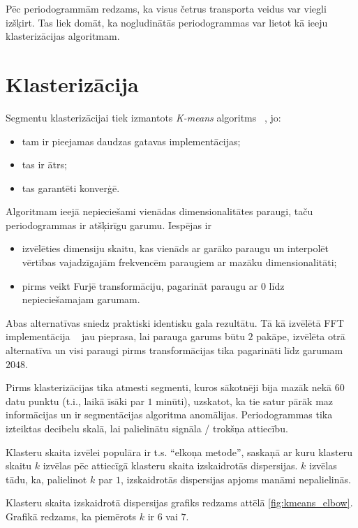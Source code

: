 \documentclass{ludis}
\begin{document}
Pēc periodogrammām redzams, ka visus četrus transporta veidus var viegli izšķirt. Tas liek domāt,
ka nogludinātās periodogrammas var lietot kā ieeju klasterizācijas algoritmam.

\section{Klasterizācija}
Segmentu klasterizācijai tiek izmantots \emph{K-means} algoritms ~\cite{Rcore}, jo:
\begin{itemize}
\item tam ir pieejamas daudzas gatavas implementācijas;
\item tas ir ātrs;
\item tas garantēti konverģē.
\end{itemize}

Algoritmam ieejā nepieciešami vienādas dimensionalitātes paraugi, taču periodogrammas ir atšķirīgu
garumu. Iespējas ir 
\begin{itemize}
\item izvēlēties dimensiju skaitu, kas vienāds ar garāko paraugu un interpolēt vērtības 
  vajadzīgajām frekvencēm paraugiem ar mazāku dimensionalitāti;
\item pirms veikt Furjē transformāciju, pagarināt paraugu ar $0$ līdz nepieciešamajam garumam.
\end{itemize}

Abas alternatīvas sniedz praktiski identisku gala rezultātu. Tā kā izvēlētā FFT
implementācija ~\cite{commons_math} jau pieprasa, lai parauga garums būtu $2$ pakāpe, 
izvēlēta otrā alternatīva un visi paraugi pirms transformācijas tika pagarināti līdz garumam $2048$.

Pirms klasterizācijas tika atmesti segmenti, kuros sākotnēji bija mazāk nekā $60$ datu punktu (t.i.,
laikā īsāki par $1$ minūti), uzskatot, ka tie satur pārāk maz informācijas un ir segmentācijas
algoritma anomālijas. Periodogrammas tika izteiktas decibelu skalā, lai palielinātu signāla / 
trokšņa attiecību.

Klasteru skaita izvēlei populāra ir t.s. ``elkoņa metode'', saskaņā ar kuru klasteru skaitu $k$
izvēlas pēc attiecīgā klasteru skaita izskaidrotās dispersijas. $k$ izvēlas tādu, ka, palielinot
$k$ par $1$, izskaidrotās dispersijas apjoms manāmi nepalielinās.

Klasteru skaita izskaidrotā dispersijas grafiks redzams attēlā \ref{fig:kmeans_elbow}. Grafikā 
redzams, ka piemērots $k$ ir $6$ vai $7$.
\end{document}
